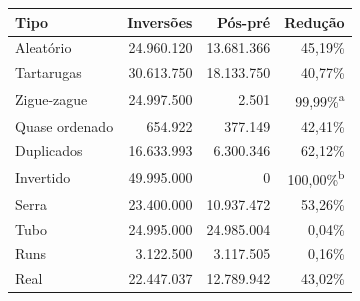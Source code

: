 \begin{tabular}{lrrr}
\hline
\textbf{Tipo} & \textbf{Inversões} & \textbf{Pós-pré} & \textbf{Redução} \\
\hline
Aleatório & 24.960.120 & 13.681.366 & 45,19\% \\
Tartarugas & 30.613.750 & 18.133.750 & 40,77\% \\
Zigue-zague & 24.997.500 & 2.501 & 99,99\%\textsuperscript{a} \\
Quase ordenado & 654.922 & 377.149 & 42,41\% \\
Duplicados & 16.633.993 & 6.300.346 & 62,12\% \\
Invertido & 49.995.000 & 0 & 100,00\%\textsuperscript{b} \\
Serra & 23.400.000 & 10.937.472 & 53,26\% \\
Tubo & 24.995.000 & 24.985.004 & 0,04\% \\
Runs & 3.122.500 & 3.117.505 & 0,16\% \\
Real & 22.447.037 & 12.789.942 & 43,02\% \\
\hline
\end{tabular}
